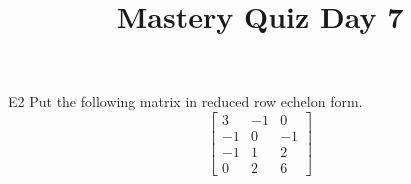 \documentclass{sbgLAquiz}
\title{Mastery Quiz Day 7 }
\begin{document}
\begin{problem}{E2}
Put the following matrix in reduced row echelon form.
$$\begin{bmatrix}
 3 & -1 & 0 \\
 -1 & 0 & -1 \\
 -1 & 1 & 2 \\
 0 & 2 & 6
\end{bmatrix}$$
\end{problem}
\end{document}
